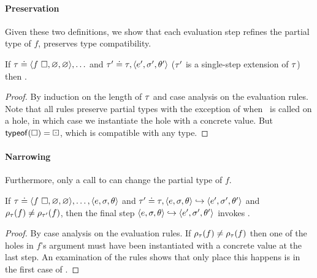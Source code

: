 \paragraph{Preservation}
Given these two definitions, we show that each evaluation step
refines the partial type of $f$, \ie preserves type compatibility.
%
\begin{lem}
\label{lem:refine-partial}
If $\tau \doteq \langle f\ \square{}, \varnothing, \varnothing \rangle,\ldots$ and
$\tau' \doteq \tau, \langle e', \sigma', \theta' \rangle$ (\ie $\tau'$ is a single-step
extension of $\tau$)
%
%
then .
\end{lem}
\begin{proof}
  By induction on the length of $\tau$ and case analysis on the evaluation rules.
  Note that all rules preserve partial types with the exception of when
  \forcesym\ is called on a hole, in which case we instantiate the hole with
  a concrete value.
  But $\mathsf{typeof}(\square{}) = \boxdot{}$, which is compatible with any type.
\end{proof}

\paragraph{Narrowing}
%
Furthermore, only a call to \forcesym can change the partial type of $f$.
%
\begin{lem}
\label{lem:force-inst}
If
$\tau \doteq \langle f\ \square{}, \varnothing, \varnothing \rangle,\ldots,\langle e, \sigma, \theta \rangle$
and
$\tau' \doteq \tau, \langle e, \sigma, \theta \rangle \hookrightarrow \langle e', \sigma', \theta' \rangle$
and
$\rho_{\tau}(f) \neq \rho_{\tau'}(f)$,
then the final step $\langle e, \sigma, \theta \rangle \hookrightarrow \langle e', \sigma', \theta' \rangle$ invokes \forcesym.
\end{lem}

\begin{proof}
  By case analysis on the evaluation rules.
  If $\rho_{\tau}(f) \neq \rho_{\tau}(f)$ then one of the holes in $f$'s
  argument must have been instantiated with a concrete value at the last step.
  An examination of the rules shows that only place this happens is
  in the first case of \forcesym.
\end{proof}

